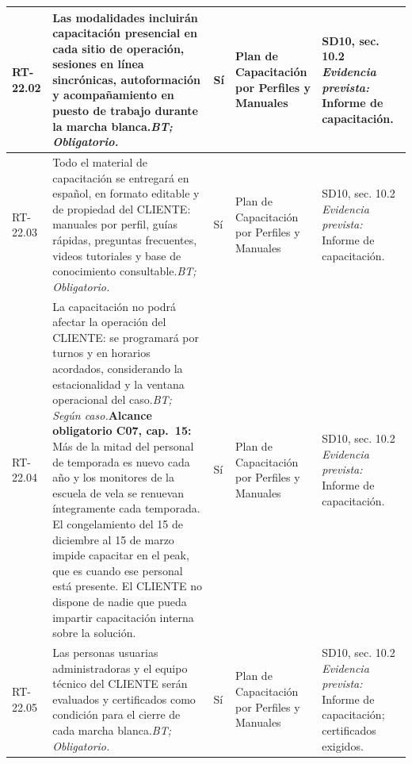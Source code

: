 \begin{paginaHorizontalSynaptix}
\begin{longtable}{|L{0.09\AnchoMatrizTDoce}|L{0.385\AnchoMatrizTDoce}|L{0.065\AnchoMatrizTDoce}|L{0.18\AnchoMatrizTDoce}|L{0.28\AnchoMatrizTDoce}|}
RT-\allowbreak{}22.\allowbreak{}02 &
Las modalidades incluirán capacitación presencial en cada sitio de operación, sesiones en línea sincrónicas, autoformación y acompañamiento en puesto de trabajo durante la marcha blanca.\newline\textit{BT; Obligatorio.} &
Sí &
Plan de Capacitación por Perfiles y Manuales &
SD10, sec. 10.2 \newline\textit{Evidencia prevista:} Informe de capacitación. \\ \hline

RT-\allowbreak{}22.\allowbreak{}03 &
Todo el material de capacitación se entregará en español, en formato editable y de propiedad del CLIENTE: manuales por perfil, guías rápidas, preguntas frecuentes, videos tutoriales y base de conocimiento consultable.\newline\textit{BT; Obligatorio.} &
Sí &
Plan de Capacitación por Perfiles y Manuales &
SD10, sec. 10.2 \newline\textit{Evidencia prevista:} Informe de capacitación. \\ \hline

RT-\allowbreak{}22.\allowbreak{}04 &
La capacitación no podrá afectar la operación del CLIENTE: se programará por turnos y en horarios acordados, considerando la estacionalidad y la ventana operacional del caso.\newline\textit{BT; Según caso.}\newline\textbf{Alcance obligatorio C07, cap.~15:} Más de la mitad del personal de temporada es nuevo cada año y los monitores de la escuela de vela se renuevan íntegramente cada temporada. El congelamiento del 15 de diciembre al 15 de marzo impide capacitar en el peak, que es cuando ese personal está presente. El CLIENTE no dispone de nadie que pueda impartir capacitación interna sobre la solución. &
Sí &
Plan de Capacitación por Perfiles y Manuales &
SD10, sec. 10.2 \newline\textit{Evidencia prevista:} Informe de capacitación. \\ \hline

RT-\allowbreak{}22.\allowbreak{}05 &
Las personas usuarias administradoras y el equipo técnico del CLIENTE serán evaluados y certificados como condición para el cierre de cada marcha blanca.\newline\textit{BT; Obligatorio.} &
Sí &
Plan de Capacitación por Perfiles y Manuales &
SD10, sec. 10.2 \newline\textit{Evidencia prevista:} Informe de capacitación; certificados exigidos. \\ \hline


\end{longtable}
\end{paginaHorizontalSynaptix}
